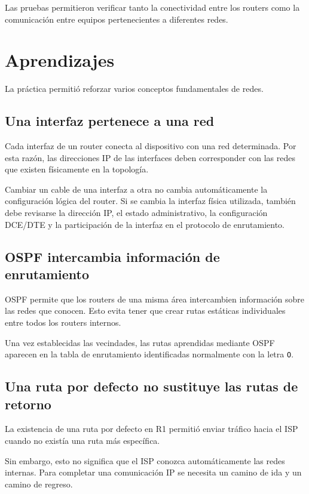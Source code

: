 \documentclass[12pt,a4paper]{article}
\begin{document}
Las pruebas permitieron verificar tanto la conectividad entre los routers como la comunicación entre equipos pertenecientes a diferentes redes.

\section{Aprendizajes}

La práctica permitió reforzar varios conceptos fundamentales de redes.

\subsection{Una interfaz pertenece a una red}

Cada interfaz de un router conecta al dispositivo con una red determinada. Por esta razón, las direcciones IP de las interfaces deben corresponder con las redes que existen físicamente en la topología.

Cambiar un cable de una interfaz a otra no cambia automáticamente la configuración lógica del router. Si se cambia la interfaz física utilizada, también debe revisarse la dirección IP, el estado administrativo, la configuración DCE/DTE y la participación de la interfaz en el protocolo de enrutamiento.

\subsection{OSPF intercambia información de enrutamiento}

OSPF permite que los routers de una misma área intercambien información sobre las redes que conocen. Esto evita tener que crear rutas estáticas individuales entre todos los routers internos.

Una vez establecidas las vecindades, las rutas aprendidas mediante OSPF aparecen en la tabla de enrutamiento identificadas normalmente con la letra \texttt{O}.

\subsection{Una ruta por defecto no sustituye las rutas de retorno}

La existencia de una ruta por defecto en R1 permitió enviar tráfico hacia el ISP cuando no existía una ruta más específica.

Sin embargo, esto no significa que el ISP conozca automáticamente las redes internas. Para completar una comunicación IP se necesita un camino de ida y un camino de regreso.
\end{document}
